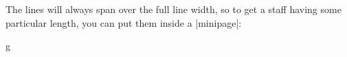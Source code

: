 The lines will always span over the full line width, so to get a staff having 
some particular length, you can put them inside a |{minipage}|:
\def\tmline{\begin{minipage}{\linewidth}\oldtmline}%
\def\endtmline{\oldendtmline\end{minipage}}%
\begin{codeexample}[]
\begin{minipage}{4cm}
\begin{tmline}
\begin{tmstaff}{g}{}\end{tmstaff}
\end{tmline}
\end{minipage}
\end{codeexample}
\def\tmline{\begin{minipage}{\linewidth-5mm}\oldtmline}%
\def\endtmline{\oldendtmline\end{minipage}}%
